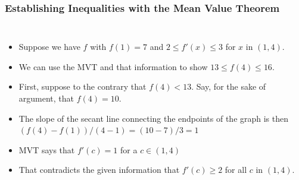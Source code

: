 \documentclass[serif,ignorenonframetext]{beamer}
\begin{document}
\begin{frame}
  \frametitle{Establishing Inequalities with the Mean Value Theorem}
  \begin{columns}
  \begin{itemize}[<+->]
  \item Suppose we have $f$ with $f(1)=7$ and
    $2\le f'(x)\le 3$ for $x$ in $(1,4)$.
  \item We can use the MVT and that information
    to show $13 \le f(4) \le 16$.
  \item First, suppose to the contrary that $f(4)<13$.  Say, for the sake
    of argument, that $f(4)=10$.
  \item The slope of the secant line connecting the endpoints of the
    graph is then $(f(4)-f(1))/(4-1)=(10-7)/3=1$
  \item MVT says that $f'(c)=1$ for a $c\in(1,4)$
  \item That contradicts the given information that $f'(c)\ge 2$
    for all $c$ in $(1,4)$.
  \end{itemize}

\end{columns}
\end{frame}
\end{document}
